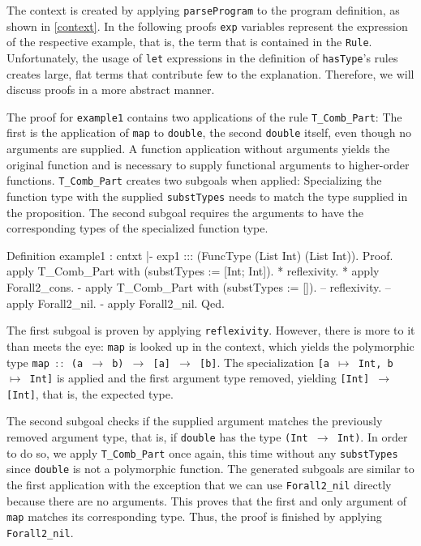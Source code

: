 \documentclass[paper = a4, fleqn, abstract=on, twoside]{scrreprt}
\begin{document}
The context is created by applying \texttt{parseProgram} to the program definition, as shown in \autoref{context}. In the following proofs \texttt{exp} variables represent the expression of the respective example, that is, the term that is contained in the \texttt{Rule}. Unfortunately, the usage of \texttt{let} expressions in the definition of \texttt{hasType}'s rules creates large, flat terms that contribute few to the explanation. Therefore, we will discuss proofs in a more abstract manner.\\ 
\par \noindent
The proof for \texttt{example1} contains two applications of the rule \texttt{T\_Comb\_Part}: The first is the application of \texttt{map} to \texttt{double}, the second \texttt{double} itself, even though no arguments are supplied. A function application without arguments yields the original function and is necessary to supply functional arguments to higher-order functions. \texttt{T\_Comb\_Part} creates two subgoals when applied: Specializing the function type with the supplied \texttt{substTypes} needs to match the type supplied in the proposition. The second subgoal requires the arguments to have the corresponding types of the specialized function type.
\begin{coqcode}
Definition example1 : cntxt |- exp1 ::: (FuncType (List Int) (List Int)).
Proof.
  apply T_Comb_Part with (substTypes := [Int; Int]).
  * reflexivity.
  * apply Forall2_cons.
    - apply T_Comb_Part with (substTypes := []).
      -- reflexivity.
      -- apply Forall2_nil.
    - apply Forall2_nil.
Qed.
\end{coqcode}
The first subgoal is proven by applying \texttt{reflexivity}. However, there is more to it than meets the eye: \texttt{map} is looked up in the context, which yields the polymorphic type \texttt{\mbox{map $::$} (a $\rightarrow$ b) $\rightarrow$ [a] $\rightarrow$ [b]}. The specialization \texttt{[a $\mapsto$ Int, b $\mapsto$ Int]} is applied and the first argument type removed, yielding \texttt{[Int] $\rightarrow$ [Int]}, that is, the expected type.
\par
The second subgoal checks if the supplied argument matches the previously removed argument type, that is, if \texttt{double} has the type \texttt{(Int $\rightarrow$ Int)}. In order to do so, we apply \texttt{T\_Comb\_Part} once again, this time without any \texttt{substTypes} since \texttt{double} is not a polymorphic function. The generated subgoals are similar to the first application with the exception that we can use \texttt{Forall2\_nil} directly because there are no arguments. This proves that the first and only argument of \texttt{map} matches its corresponding type. Thus, the proof is finished by applying \texttt{Forall2\_nil}.
\end{document}
